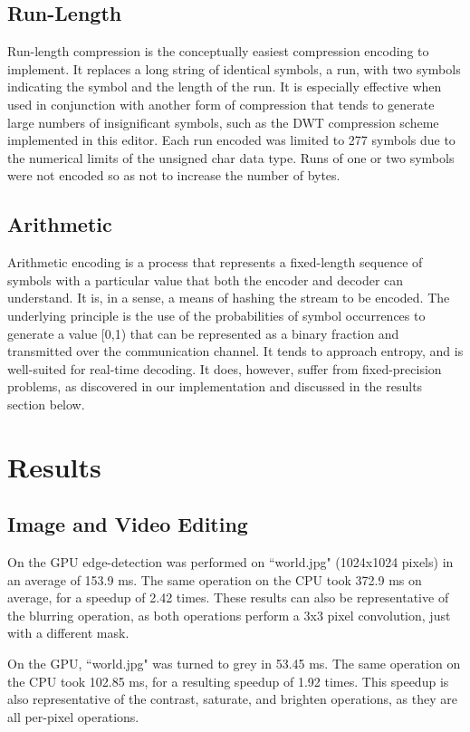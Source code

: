 \documentclass[10pt,twocolumn,twoside]{IEEEtran}
\begin{document}
\subsection{Run-Length}
Run-length compression is the conceptually easiest compression encoding to implement. It replaces a long string of identical symbols, a run, with two symbols indicating the symbol and the length of the run. It is especially effective when used in conjunction with another form of compression that tends to generate large numbers of insignificant symbols, such as the DWT compression scheme implemented in this editor. Each run encoded was limited to 277 symbols due to the numerical limits of the unsigned char data type. Runs of one or two symbols were not encoded so as not to increase the number of bytes.

\subsection{Arithmetic}
Arithmetic encoding is a process that represents a fixed-length sequence of symbols with a particular value that both the encoder and decoder can understand. It is, in a sense, a means of hashing the stream to be encoded. The underlying principle is the use of the probabilities of symbol occurrences to generate a value [0,1) that can be represented as a binary fraction and transmitted over the communication channel. It tends to approach entropy, and is well-suited for real-time decoding. It does, however, suffer from fixed-precision problems, as discovered in our implementation and discussed in the results section below.

\section{Results}

\subsection{Image and Video Editing}
On the GPU edge-detection was performed on ``world.jpg" (1024x1024 pixels) in an average of 153.9 ms. The same operation on the CPU took 372.9 ms on average, for a speedup of 2.42 times. These results can also be representative of the blurring operation, as both operations perform a 3x3 pixel convolution, just with a different mask.

On the GPU, ``world.jpg" was turned to grey in 53.45 ms. The same operation on the CPU took 102.85 ms, for a resulting speedup of 1.92 times. This speedup is also representative of the contrast, saturate, and brighten operations, as they are all per-pixel operations.
\end{document}
